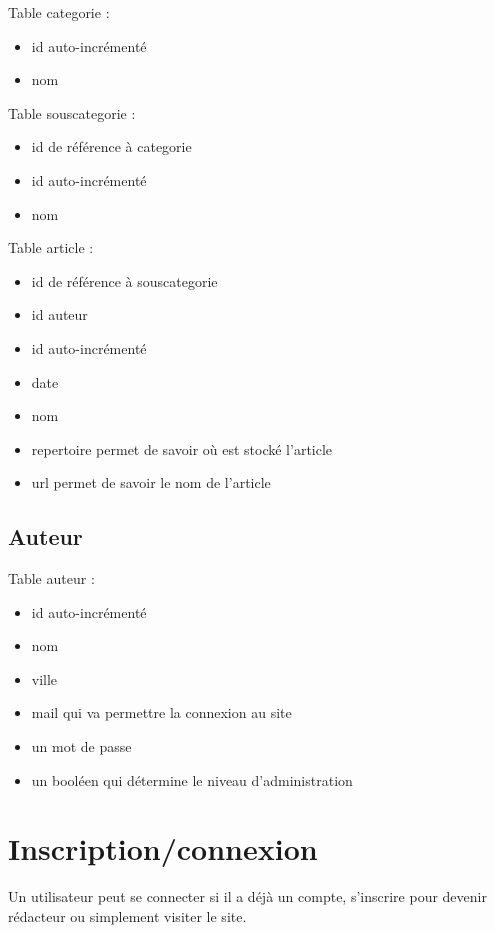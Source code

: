 \documentclass[hidelinks, 12pt,a4paper]{article}
\begin{document}
Table categorie : \\
\begin{itemize}
\item id auto-incrémenté
\item nom
\end{itemize}

Table souscategorie : \\
\begin{itemize}
\item id de référence à categorie
\item id auto-incrémenté
\item nom
\end{itemize}

Table article : \\
\begin{itemize}
\item id de référence à souscategorie
\item id auteur
\item id auto-incrémenté
\item date
\item nom
\item repertoire permet de savoir où est stocké l'article
\item url permet de savoir le nom de l'article
\end{itemize}

\subsection{Auteur}

Table auteur : \\
\begin{itemize}
\item id auto-incrémenté
\item nom
\item ville
\item mail qui va permettre la connexion au site
\item un mot de passe
\item un booléen qui détermine le niveau d'administration
\end{itemize}

\newpage
\section{Inscription/connexion}
Un utilisateur peut se connecter si il a déjà un compte, s'inscrire pour devenir rédacteur ou simplement visiter le site.
\end{document}
